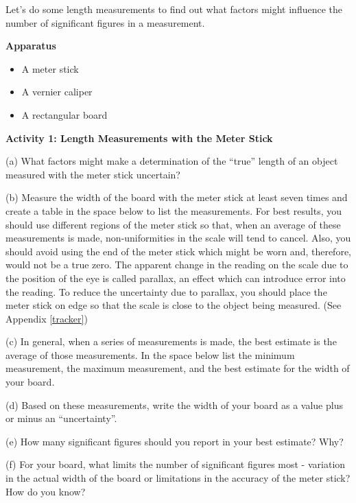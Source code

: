 Let's do some length measurements to find out what factors might influence the
number of significant figures in a measurement. 

\textbf{Apparatus} 

\begin{itemize}
\item A meter stick 
\item A vernier caliper 
\item A rectangular board
\end{itemize}
\textbf{Activity 1: Length Measurements with the Meter Stick }

(a) What factors might make a determination of the ``true''
length of an object measured with the meter stick uncertain? 
\vspace{20mm}

(b) Measure the width of the board with the meter stick at least seven times
and create a table in the space below to list the measurements. For best results,
you should use different regions of the meter stick so that, when an average
of these measurements is made, non-uniformities in the scale will tend to cancel.
Also, you should avoid using the end of the meter stick which might be worn
and, therefore, would not be a true zero. The apparent change in the reading
on the scale due to the position of the eye is called parallax, an effect which
can introduce error into the reading. To reduce the uncertainty due to parallax,
you should place the meter stick on edge so that the scale is close to the object
being measured. (See Appendix \ref{tracker}) 
\vspace{25mm}

(c) In general, when a series of measurements is made, the best estimate is
the average of those measurements. In the space below list the minimum measurement,
the maximum measurement, and the best estimate for the width of your board.
\vspace{20mm}

(d) Based on these measurements, write the width of your board as a value plus or minus an ``uncertainty''.
\vspace{15mm}

(e) How many significant figures should you report in your best estimate? Why?
\vspace{15mm}

(f) For your board, what limits the number of significant figures most - variation
in the actual width of the board or limitations in the accuracy of the meter
stick? How do you know?
\vspace{15mm}

